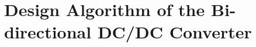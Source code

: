 \documentclass[energies,article,submit,moreauthors,pdftex]{Definitions/mdpi}
\begin{document}
\section{Design Algorithm of the Bi-directional DC/DC Converter}





\end{document}
